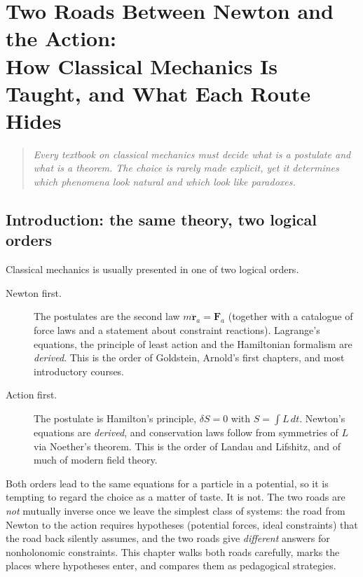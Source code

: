 \chapter{Two Roads Between Newton and the Action:\\
How Classical Mechanics Is Taught, and What Each Route Hides}
\label{ch:two-roads}

\begin{quote}\itshape
Every textbook on classical mechanics must decide what is a postulate and
what is a theorem. The choice is rarely made explicit, yet it determines which
phenomena look natural and which look like paradoxes.
\end{quote}

\section{Introduction: the same theory, two logical orders}
\label{sec:two-orders}

Classical mechanics is usually presented in one of two logical orders.

\begin{description}
  \item[Newton first.] The postulates are the second law
  $m\ddot{\mathbf r}_a=\mathbf F_a$ (together with a catalogue of force laws
  and a statement about constraint reactions). Lagrange's equations, the
  principle of least action and the Hamiltonian formalism are \emph{derived}.
  This is the order of Goldstein, Arnold's first chapters, and most
  introductory courses.
  \item[Action first.] The postulate is Hamilton's principle,
  $\delta S=0$ with $S=\int L\,dt$. Newton's equations are \emph{derived}, and
  conservation laws follow from symmetries of $L$ via Noether's theorem. This
  is the order of Landau and Lifshitz, and of much of modern field theory.
\end{description}

Both orders lead to the same equations for a particle in a potential, so it is
tempting to regard the choice as a matter of taste. It is not. The two roads
are \emph{not} mutually inverse once we leave the simplest class of systems:
the road from Newton to the action requires hypotheses (potential forces,
ideal constraints) that the road back silently assumes, and the two roads give
\emph{different} answers for nonholonomic constraints. This chapter walks both
roads carefully, marks the places where hypotheses enter, and compares them
as pedagogical strategies.

